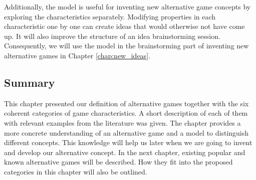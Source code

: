 Additionally, the model is useful for inventing new alternative game concepts by exploring the characteristics separately. Modifying properties in each characteristic one by one can create ideas that would otherwise not have come up. It will also improve the structure of an idea brainstorming session. Consequently, we will use the model in the brainstorming part of inventing new alternative games in Chapter \ref{chap:new_ideas}.

\subsection{Summary}
This chapter presented our definition of alternative games together with the six coherent categories of game characteristics. A short description of each of them with relevant examples from the literature was given. The chapter provides a more concrete understanding of an alternative game and a model to distinguish different concepts. This knowledge will help us later when we are going to invent and develop our alternative concept. In the next chapter, existing popular and known alternative games will be described. How they fit into the proposed categories in this chapter will also be outlined.